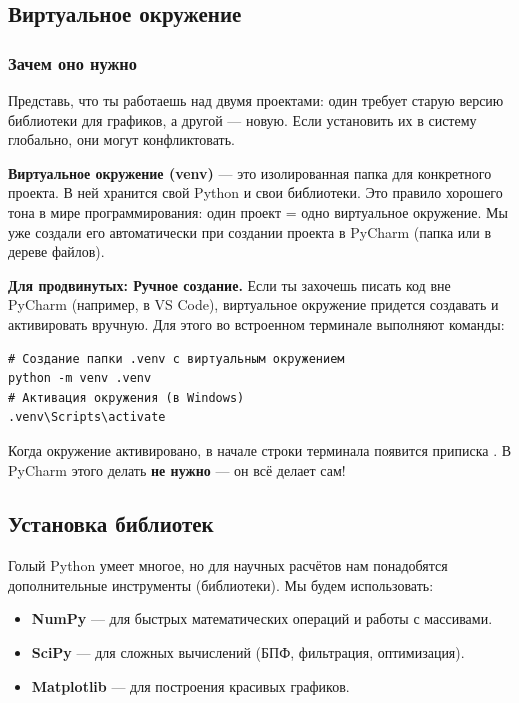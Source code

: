 \subsection{Виртуальное окружение}
\subsubsection{Зачем оно нужно}

Представь, что ты работаешь над двумя проектами: один требует старую версию библиотеки для графиков, а другой — новую. Если установить их в систему глобально, они могут конфликтовать. 

\textbf{Виртуальное окружение (venv)} — это изолированная папка для конкретного проекта. В ней хранится свой Python и свои библиотеки. Это правило хорошего тона в мире программирования: один проект = одно виртуальное окружение. Мы уже создали его автоматически при создании проекта в PyCharm (папка  или  в дереве файлов).

\begin{tcolorbox}[colback=ForestGreen!5!white, colframe=ForestGreen!75!black, title=\textbf{Совет}, arc=2mm]
\textbf{Для продвинутых: Ручное создание.}
Если ты захочешь писать код вне PyCharm (например, в VS Code), виртуальное окружение придется создавать и активировать вручную. Для этого во встроенном терминале выполняют команды:
\begin{verbatim}
# Создание папки .venv с виртуальным окружением
python -m venv .venv
# Активация окружения (в Windows)
.venv\Scripts\activate
\end{verbatim}
Когда окружение активировано, в начале строки терминала появится приписка . В PyCharm этого делать \textbf{не нужно} — он всё делает сам!
\end{tcolorbox}

\subsection{Установка библиотек}
Голый Python умеет многое, но для научных расчётов нам понадобятся дополнительные инструменты (библиотеки). Мы будем использовать:
\begin{itemize}
    \item \textbf{NumPy} — для быстрых математических операций и работы с массивами.
    \item \textbf{SciPy} — для сложных вычислений (БПФ, фильтрация, оптимизация).
    \item \textbf{Matplotlib} — для построения красивых графиков.
\end{itemize}

